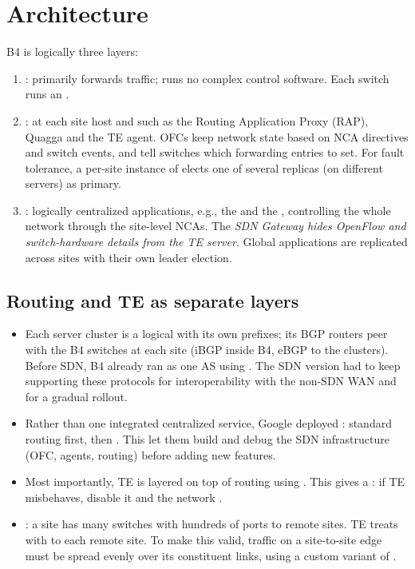 \section{Architecture}
B4 is logically three layers:
\begin{enumerate}
\item {}: primarily forwards traffic; runs no complex control software. Each switch runs an .
\item {}:  at each site host  and  such as the Routing Application Proxy (RAP), Quagga and the TE agent. OFCs keep network state based on NCA directives and switch events, and tell switches which forwarding entries to set. For fault tolerance, a per-site instance of  elects one of several replicas (on different servers) as primary.
\item {}: logically centralized applications, e.g., the  and the , controlling the whole network through the site-level NCAs. The \emph{SDN Gateway hides OpenFlow and switch-hardware details from the TE server}. Global applications are replicated across sites with their own leader election.
\end{enumerate}

\subsection{Routing and TE as separate layers}
\begin{itemize}
\item Each server cluster is a logical  with its own prefixes; its BGP routers peer with the B4 switches at each site (iBGP inside B4, eBGP to the clusters). Before SDN, B4 already ran as one AS using . The SDN version had to keep supporting these protocols for interoperability with the non-SDN WAN and for a gradual rollout.
\item Rather than one integrated centralized service, Google deployed : standard routing first, then . This let them build and debug the SDN infrastructure (OFC, agents, routing) before adding new features.
\item Most importantly, TE is layered on top of routing using . This gives a : if TE misbehaves, disable it and the network .
\item {}: a site has many switches with hundreds of ports to remote sites. TE treats  with  to each remote site. To make this valid, traffic on a site-to-site edge must be spread evenly over its constituent links, using a custom variant of .
\end{itemize}

